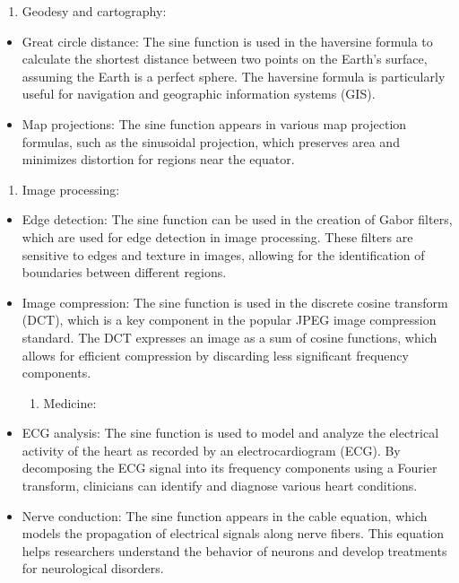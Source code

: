\documentclass[
]{article}
\providecommand{\tightlist}{%
  \setlength{\itemsep}{0pt}\setlength{\parskip}{0pt}}
\begin{document}
\begin{enumerate}
\def\labelenumi{\arabic{enumi}.}
\setcounter{enumi}{2}
\tightlist
\item
  Geodesy and cartography:
\end{enumerate}

\begin{itemize}
\item
  Great circle distance: The sine function is used in the haversine
  formula to calculate the shortest distance between two points on the
  Earth's surface, assuming the Earth is a perfect sphere. The haversine
  formula is particularly useful for navigation and geographic
  information systems (GIS).
\item
  Map projections: The sine function appears in various map projection
  formulas, such as the sinusoidal projection, which preserves area and
  minimizes distortion for regions near the equator.
\end{itemize}

\begin{enumerate}
\def\labelenumi{\arabic{enumi}.}
\setcounter{enumi}{3}
\tightlist
\item
  Image processing:
\end{enumerate}

\begin{itemize}
\item
  Edge detection: The sine function can be used in the creation of Gabor
  filters, which are used for edge detection in image processing. These
  filters are sensitive to edges and texture in images, allowing for the
  identification of boundaries between different regions.
\item
  Image compression: The sine function is used in the discrete cosine
  transform (DCT), which is a key component in the popular JPEG image
  compression standard. The DCT expresses an image as a sum of cosine
  functions, which allows for efficient compression by discarding less
  significant frequency components.

  \begin{enumerate}
  \def\labelenumi{\arabic{enumi}.}
  \setcounter{enumi}{4}
  \tightlist
  \item
    Medicine:
  \end{enumerate}
\item
  ECG analysis: The sine function is used to model and analyze the
  electrical activity of the heart as recorded by an electrocardiogram
  (ECG). By decomposing the ECG signal into its frequency components
  using a Fourier transform, clinicians can identify and diagnose
  various heart conditions.
\item
  Nerve conduction: The sine function appears in the cable equation,
  which models the propagation of electrical signals along nerve fibers.
  This equation helps researchers understand the behavior of neurons and
  develop treatments for neurological disorders.
\end{itemize}
\end{document}
